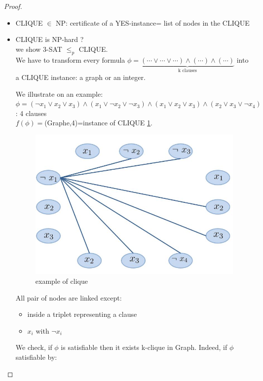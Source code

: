 \begin{proof}
\begin{itemize}
\item CLIQUE $\in$ NP: certificate of a YES-instance= list of nodes in the CLIQUE
\item CLIQUE is NP-hard ? \\
we show 3-SAT $\leq_p$ CLIQUE.  \\
We have to transform every formula $\phi=\underbrace{( \cdots \vee \cdots \vee \cdots) \wedge ( \cdots ) \wedge ( \cdots)}_{\text{k clauses}}$ into a CLIQUE instance: a graph or an integer. 

We illustrate on an example: \\ $\phi=(\neg x_1 \vee x_2 \vee x_3) \wedge (x_1 \vee \neg x_2 \vee \neg x_3) \wedge (x_1 \vee x_2 \vee x_3) \wedge (x_2 \vee x_3 \vee \neg x_4)$: 4 clauses \\ $f(\phi)=$(Graphe,4)=instance of CLIQUE \ref{c12:clique1}. 

\begin{figure}[h!]
\centering
\includegraphics[scale=0.5]{images/fig_3.jpg}
\caption{example of clique}
\label{c12:clique1}
\end{figure}

All pair of nodes are linked except: 
\begin{itemize}
\item inside a triplet representing a clause
\item $x_i$ with $\neg x_i$
\end{itemize}

We check, if $\phi$ is satisfiable then it exists k-clique in Graph. Indeed, if $\phi$ satisfiable by: 


\end{itemize}
\end{proof}
